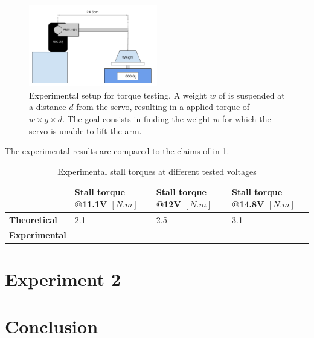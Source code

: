\begin{figure}[htp]
\center
    \includegraphics[width = 0.5\textwidth]{figures/exp1}
    \caption[Experimental setup for torque testing]{Experimental setup for torque testing. A weight $w$ of is suspended at a distance $d$ from the servo, resulting in a applied torque of $w \times g \times d$. The goal consists in finding the weight $w$ for which the servo is unable to lift the arm.}
    \label{fig:exp1}
\end{figure}

The experimental results are compared to the claims of \cite{mx_28_manual} in \cref{table:exp1_results}.
\begin{table}[htp]
\center
\begin{tabularx}{\textwidth}{@{}l X X X @{}}
\toprule
& \textbf{Stall torque @11.1V $[N.m]$} & \textbf{Stall torque @12V $[N.m]$} & \textbf{Stall torque @14.8V $[N.m]$}\\ 
\midrule
\textbf{Theoretical} & 2.1 & 2.5 & 3.1\\ 
\textbf{Experimental} &  &  & \\ 
\bottomrule
\end{tabularx}
\caption{Experimental stall torques at different tested voltages}
\label{table:exp1_results}
\end{table}

\section{Experiment 2}

\section{Conclusion}